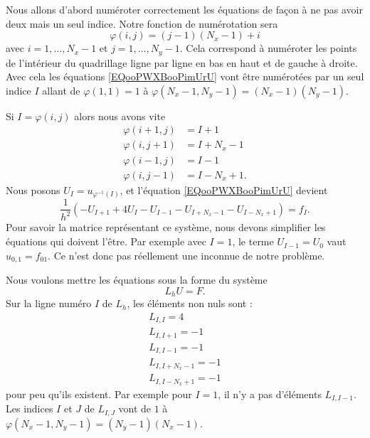 Nous allons d'abord numéroter correctement les équations de façon à ne pas avoir deux mais un seul indice. Notre fonction de numérotation sera
\begin{equation}
    \varphi(i,j)=(j-1)(N_x-1)+i
\end{equation}
avec \( i=1,\ldots, N_x-1\) et \( j=1,\ldots, N_y-1\). Cela correspond à numéroter les points de l'intérieur du quadrillage ligne par ligne en bas en haut et de gauche à droite. Avec cela les équations \eqref{EQooPWXBooPimUrU} vont être numérotées par un seul indice \( I\) allant de \( \varphi(1,1)=1\) à \( \varphi(N_x-1,N_y-1)=(N_x-1)(N_y-1)\).

Si \( I=\varphi(i,j)\) alors nous avons vite
\begin{subequations}
    \begin{align}
        \varphi(i+1,j)&=I+1\\
        \varphi(i,j+1)&=I+N_x-1\\
        \varphi(i-1,j)&=I-1\\
        \varphi(i,j-1)&=I-N_x+1.
    \end{align}
\end{subequations}
Nous posons \( U_I=u_{\varphi^{-1}(I)}\), et l'équation \eqref{EQooPWXBooPimUrU} devient 
\begin{equation}
    \frac{1}{ h^2 }(-U_{I+1}+4U_I-U_{I-1}-U_{I+N_x-1}-U_{I-N_x+1})=f_I.
\end{equation}
Pour savoir la matrice représentant ce système, nous devons simplifier les équations qui doivent l'être. Par exemple avec \( I=1\), le terme \( U_{I-1}=U_0\) vaut \( u_{0,1}=f_01\). Ce n'est donc pas réellement une inconnue de notre problème.

Nous voulons mettre les équations sous la forme du système
\begin{equation}
    L_hU=F.
\end{equation}
Sur la ligne numéro \( I\) de \( L_h\), les éléments non nuls sont :
\begin{subequations}        \label{SUBEQQooSRQNooYrCNhj}
    \begin{align}
        L_{I,I}=4\\
        L_{I,I+1}=-1\\
        L_{I,I-1}=-1\\
        L_{I,I+N_x-1}=-1\\
        L_{I,I-N_x+1}=-1
    \end{align}
\end{subequations}
pour peu qu'ils existent. Par exemple pour \( I=1\), il n'y a pas d'éléments \( L_{I,I-1}\). Les indices \( I\) et \( J\) de \( L_{I,J}\) vont de \( 1\) à \( \varphi(N_x-1,N_y-1)=(N_y-1)(N_x-1)\).

